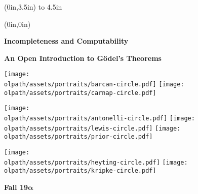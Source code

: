 
\thispagestyle{empty}
\begin{textblock*}{\stockwidth}(0in,3.5in)
  \vbox to 4.5in{\quad}
\end{textblock*}

\textblockcolor{}
\begin{textblock*}{\stockwidth}(0in,0in)
  \noindent\hfill
  \begin{minipage}[b][\stockheight][s]{.9\stockwidth}
    \begin{raggedleft}
      \vspace*{1.7cm}
      \hfill
      \sffamily\fontsize{50pt}{50pt}\selectfont
      \color{dkleadbeater}
      \textbf{Incompleteness and Computability}%
                    
      \vspace*{1cm}
      \color{black}
      \sffamily
      \fontsize{25pt}{25pt}\selectfont
      \textbf{An Open Introduction to G\"odel's Theorems}
      \vskip2cm

      \hfill\texttt{[image: \\olpath/assets/portraits/barcan-circle.pdf]}
      \texttt{[image: \\olpath/assets/portraits/carnap-circle.pdf]}\hfill{}
      
      \texttt{[image: \\olpath/assets/portraits/antonelli-circle.pdf]}\hfill
      \texttt{[image: \\olpath/assets/portraits/lewis-circle.pdf]}\hfill
      \texttt{[image: \\olpath/assets/portraits/prior-circle.pdf]}
      
      \hfill\texttt{[image: \\olpath/assets/portraits/heyting-circle.pdf]}
      \texttt{[image: \\olpath/assets/portraits/kripke-circle.pdf]}\hfill{}
      
      \vspace{-.5cm}
      \fontsize{16pt}{19pt}\selectfont
      \textbf{Fall 19$\boldsymbol{\alpha}$}\par
      \vspace{1cm}
    \end{raggedleft}
  \end{minipage}
  \hfill{}
\end{textblock*}

